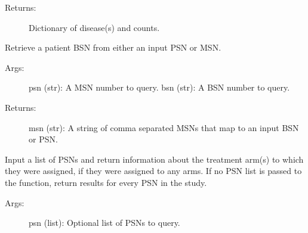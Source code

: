 \documentclass[letterpaper,10pt,english]{sphinxmanual}
\begin{document}
\begin{fulllineitems}
\begin{fulllineitems}
\begin{description}
\item[{Returns:}] \leavevmode
Dictionary of disease(s) and counts.

\end{description}

\end{fulllineitems}


\begin{fulllineitems}
\label{\detokenize{matchbox_api_utils:matchbox_api_utils.MatchData.get_msn}}
Retrieve a patient BSN from either an input PSN or MSN.
\begin{description}
\item[{Args:}] \leavevmode
psn (str): A MSN number to query.
bsn (str): A BSN number to query.

\item[{Returns:}] \leavevmode
msn (str): A string of comma separated MSNs that map to an input BSN or PSN.

\end{description}

\begin{sphinxVerbatim}[commandchars=\\\{\}]
\end{sphinxVerbatim}

\end{fulllineitems}


\begin{fulllineitems}
\label{\detokenize{matchbox_api_utils:matchbox_api_utils.MatchData.get_patient_ta_status}}
Input a list of PSNs and return information about the treatment arm(s) to which they were
assigned, if they were assigned to any arms. If no PSN list is passed to the function, return
results for every PSN in the study.
\begin{description}
\item[{Args:}] \leavevmode
psn (list):  Optional list of PSNs to query.


\end{description}
\end{fulllineitems}
\end{fulllineitems}
\end{document}
